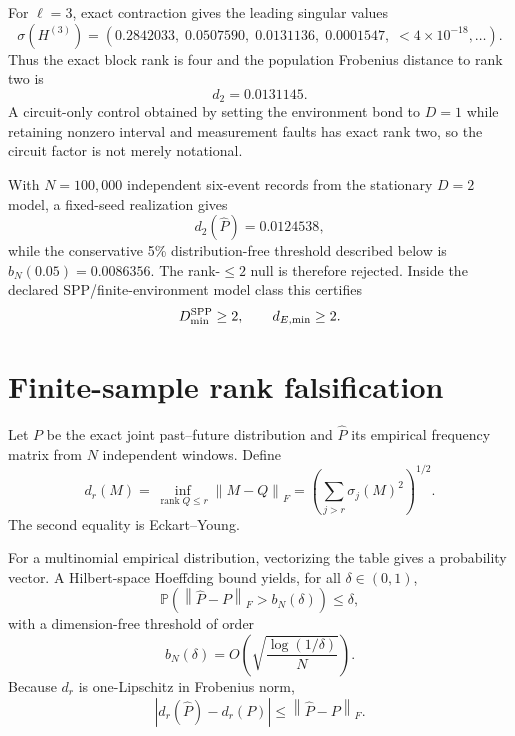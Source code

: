 \documentclass[11pt]{article}
\newcommand{\Prob}{\mathbb{P}}
\newcommand{\rank}{\operatorname{rank}}
\newcommand{\norm}[1]{\left\lVert #1\right\rVert}
\begin{document}
For $\ell=3$, exact contraction gives the leading singular values
\begin{equation}
\sigma(H^{(3)})=(0.2842033,\;0.0507590,\;0.0131136,\;0.0001547,\;<4\times10^{-18},\ldots).
\end{equation}
Thus the exact block rank is four and the population Frobenius distance to rank two is
\begin{equation}
d_2=0.0131145.
\end{equation}
A circuit-only control obtained by setting the environment bond to $D=1$ while retaining nonzero interval and measurement faults has exact rank two, so the circuit factor is not merely notational.

With $N=100{,}000$ independent six-event records from the stationary $D=2$ model, a fixed-seed realization gives
\[
d_2(\widehat P)=0.0124538,
\]
while the conservative 5\% distribution-free threshold described below is $b_N(0.05)=0.0086356$. The rank-$\le2$ null is therefore rejected. Inside the declared SPP/finite-environment model class this certifies
\[
D_{\min}^{\rm SPP}\ge2,\qquad d_{E,\min}\ge2.
\]

\section{Finite-sample rank falsification}
Let $P$ be the exact joint past--future distribution and $\widehat P$ its empirical frequency matrix from $N$ independent windows. Define
\begin{equation}
d_r(M)=\inf_{\rank Q\le r}\norm{M-Q}_F
=\left(\sum_{j>r}\sigma_j(M)^2\right)^{1/2}.
\label{eq:dr}
\end{equation}
The second equality is Eckart--Young.

For a multinomial empirical distribution, vectorizing the table gives a probability vector. A Hilbert-space Hoeffding bound yields, for all $\delta\in(0,1)$,
\begin{equation}
\Prob\!\left(\norm{\widehat P-P}_F>b_N(\delta)\right)\le\delta,
\end{equation}
with a dimension-free threshold of order
\begin{equation}
b_N(\delta)=O\!\left(\sqrt{\frac{\log(1/\delta)}{N}}\right).
\end{equation}
Because $d_r$ is one-Lipschitz in Frobenius norm,
\begin{equation}
|d_r(\widehat P)-d_r(P)|\le\norm{\widehat P-P}_F.
\end{equation}
\end{document}
